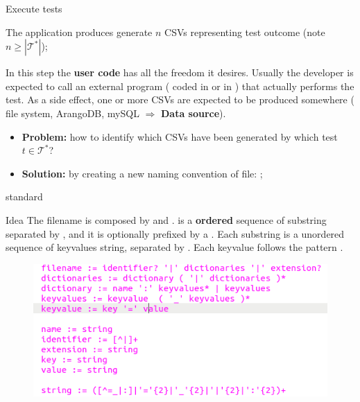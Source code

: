 \begin{frame}{Execute tests}

    \begin{block}{\hphantom{}}
        The application produces generate $n$ CSVs representing test outcome (note $n \geq |\mathcal{T}^{*}|$);
    \end{block}

    In this step the \textbf{user code} has all the freedom it desires. Usually the developer is expected to call an external program (\eg{} coded in  or in ) that actually performs the test. As a side effect, one or more CSVs are expected to be produced somewhere (\ie{} file system, ArangoDB, mySQL $\Rightarrow$ \textbf{Data source}).

    \begin{itemize}
        \item \textbf{Problem:} how to identify which CSVs have been generated by which test $t \in \mathcal{T}^{*}$?
        \item \textbf{Solution:} by creating a new naming convention of file: ;
    \end{itemize}
\end{frame}

\begin{frame}{ standard}
    \vspace{-9pt}
    \begin{block}{Idea}
        The filename is composed by  and .  is a \textbf{ordered} sequence of substring separated by \code{|}, and it is optionally prefixed by a . Each substring is a unordered sequence of keyvalues string, separated by \code{\_}. Each keyvalue follows the pattern .
    \end{block}
    \vspace{-3pt}
    \begin{figure}[h]
        \centering
        \includegraphics[width=1.0\textwidth]{src/images/ks001.png}
    \end{figure}
\end{frame}

